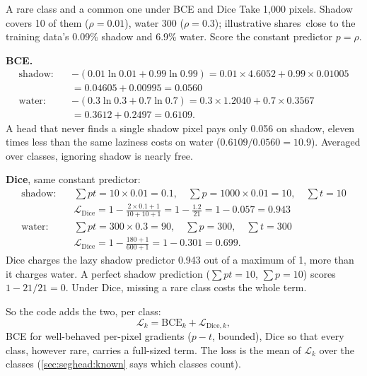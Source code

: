 \begin{worked}[label={we:seghead:imbalance}]{A rare class and a common one under BCE and Dice}
Take 1,000 pixels. Shadow covers 10 of them ($\rho = 0.01$), water 300 ($\rho = 0.3$); illustrative shares\tbrk\tagA\ close to the
training data's 0.09\% shadow and 6.9\% water. Score the constant predictor $p = \rho$.

\textbf{BCE.}
\begin{align*}
  \text{shadow:}\quad & -(0.01\ln 0.01 + 0.99\ln 0.99) = 0.01 \times 4.6052 + 0.99 \times 0.01005\\
                      & = 0.04605 + 0.00995 = 0.0560\\
  \text{water:}\quad & -(0.3\ln 0.3 + 0.7\ln 0.7) = 0.3 \times 1.2040 + 0.7 \times 0.3567\\
                      & = 0.3612 + 0.2497 = 0.6109.
\end{align*}
A head that never finds a single shadow pixel pays only 0.056 on shadow, eleven times less than the same laziness costs on water
($0.6109 / 0.0560 = 10.9$). Averaged over classes, ignoring shadow is nearly free.

\textbf{Dice}, same constant predictor:
\begin{align*}
  \text{shadow:}\quad & \textstyle\sum p t = 10 \times 0.01 = 0.1, \quad \sum p = 1000 \times 0.01 = 10, \quad \sum t = 10\\
                      & \mathcal{L}_{\text{Dice}} = 1 - \frac{2 \times 0.1 + 1}{10 + 10 + 1} = 1 - \frac{1.2}{21} = 1 - 0.057 = 0.943\\
  \text{water:}\quad & \textstyle\sum p t = 300 \times 0.3 = 90, \quad \sum p = 300, \quad \sum t = 300\\
                      & \mathcal{L}_{\text{Dice}} = 1 - \frac{180 + 1}{600 + 1} = 1 - 0.301 = 0.699.
\end{align*}
Dice charges the lazy shadow predictor 0.943 out of a maximum of 1, more than it charges water. A perfect shadow prediction
($\sum pt = 10$, $\sum p = 10$) scores $1 - 21/21 = 0$. Under Dice, missing a rare class costs the whole term.
\end{worked}

So the code adds the two, per class:
\begin{equation}\label{eq:seghead:perclass}
  \mathcal{L}_k = \mathrm{BCE}_k + \mathcal{L}_{\text{Dice},k},
\end{equation}
BCE for well-behaved per-pixel gradients ($p - t$, bounded), Dice so that every class, however rare, carries a full-sized term. The loss
is the mean of $\mathcal{L}_k$ over the classes (\cref{sec:seghead:known} says which classes count).

